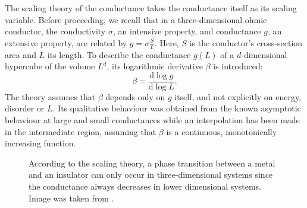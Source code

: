 \documentclass[10pt,a4paper]{article}
\begin{document}
\begin{minipage}[t]{0.57\textwidth}
The scaling theory of the conductance takes the conductance itself as its scaling variable. Before proceeding, we recall that in a three-dimensional ohmic conductor, the conductivity $\sigma$, an intensive property, and conductance $g$, an extensive property, are related by $g=\sigma \frac{S}{L}$. Here, $S$ is the conductor's cross-section area and $L$ its length. To describe the conductance $g(L)$ of a $d$-dimensional hypercube of the volume $L^d$, its logarithmic derivative $\beta$ is introduced:
\begin{equation}\label{eq:beta}
\beta=\frac{\mathrm{d}\log g}{\mathrm{d}\log L}.
\end{equation}
The theory assumes that $\beta$ depends only on $g$ itself, and not explicitly on energy, disorder or $L$. Its qualitative behaviour was obtained from the known asymptotic behaviour at large and small conductances
while an interpolation has been made in the intermediate region, assuming that $\beta$ is a continuous, monotonically increasing function. 
\end{minipage}\hfill
\begin{minipage}[t]{0.42\textwidth}
\begin{figure}[H]
\caption{According to the scaling theory, a phase transition between a metal and an insulator can only occur in three-dimensional systems since the conductance always decreases in lower dimensional systems. Image was taken from \cite{50yearsof}.}
\label{fig:scalingtheory} 
\end{figure}
\end{minipage}\\\\
\noindent
\end{document}
